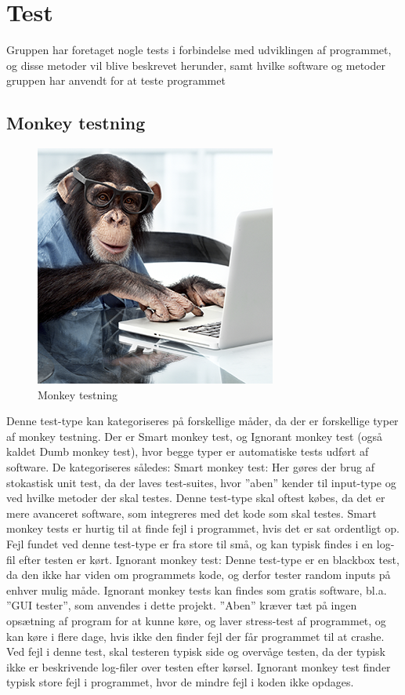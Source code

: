 \chapter{Test}
Gruppen har foretaget nogle tests i forbindelse med udviklingen af programmet, og disse metoder vil blive beskrevet herunder, samt hvilke software og metoder gruppen har anvendt for at teste programmet
\section{Monkey testning}
\begin{figure}
	\begin{center}
		\includegraphics[scale=0.75]{billeder/MonkeyTest}
	\end{center}
	\caption{Monkey testning}
\end{figure}
Denne test-type kan kategoriseres på forskellige måder, da der er forskellige typer af monkey testning. Der er Smart monkey test, og Ignorant monkey test (også kaldet Dumb monkey test), hvor begge typer er automatiske tests udført af software. De kategoriseres således:
Smart monkey test: Her gøres der brug af stokastisk unit test, da der laves test-suites, hvor ”aben” kender til input-type og ved hvilke metoder der skal testes. Denne test-type skal oftest købes, da det er mere avanceret software, som integreres med det kode som skal testes.
Smart monkey tests er hurtig til at finde fejl i programmet, hvis det er sat ordentligt op. Fejl fundet ved denne test-type er fra store til små, og kan typisk findes i en log-fil efter testen er kørt.
Ignorant monkey test: Denne test-type er en blackbox test, da den ikke har viden om programmets kode, og derfor tester random inputs på enhver mulig måde. Ignorant monkey tests kan findes som gratis software, bl.a. ”GUI tester”, som anvendes i dette projekt. ”Aben” kræver tæt på ingen opsætning af program for at kunne køre, og laver stress-test af programmet, og kan køre i flere dage, hvis ikke den finder fejl der får programmet til at crashe. Ved fejl i denne test, skal testeren typisk side og overvåge testen, da der typisk ikke er beskrivende log-filer over testen efter kørsel. Ignorant monkey test finder typisk store fejl i programmet, hvor de mindre fejl i koden ikke opdages. \citep{ExI}

